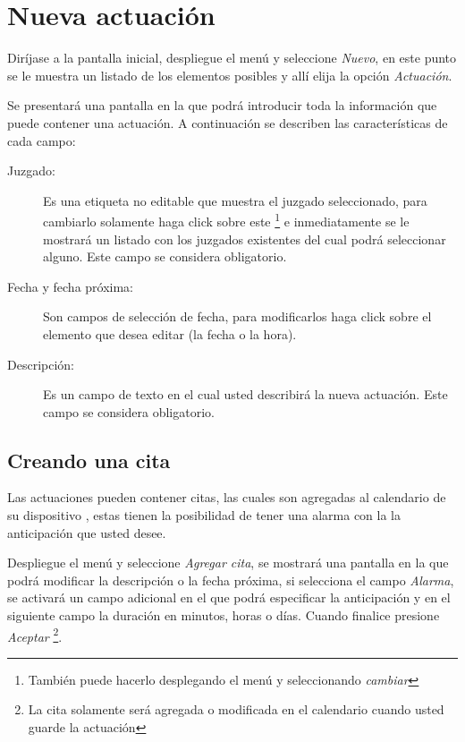 \section{Nueva actuaci\'on}
\label{sec:nuevaActuacion}
Dir\'ijase a la pantalla inicial, despliegue el men\'u \blackberry y seleccione
\emph{Nuevo}, en este punto se le muestra un listado de los elementos posibles y
all\'i elija la opci\'on \emph{Actuaci\'on}.

Se presentar\'a una pantalla en la que podr\'a introducir toda la informaci\'on
que puede contener una actuaci\'on. A continuaci\'on se describen las
caracter\'isticas de cada campo:

\begin{description}
\item[Juzgado:]Es una etiqueta no editable que muestra el juzgado
seleccionado, para cambiarlo solamente haga click sobre este
\footnote{Tambi\'en puede hacerlo desplegando el men\'u \blackberry y
seleccionando \emph{cambiar}}
e inmediatamente se le mostrar\'a un listado con los juzgados existentes del
cual podr\'a seleccionar alguno. Este campo se considera obligatorio.
\item[Fecha y fecha pr\'oxima:]Son campos de selecci\'on de fecha, para
modificarlos haga click sobre el elemento que desea editar (la fecha o la hora).
\item[Descripci\'on:]Es un campo de texto en el cual usted describir\'a la
nueva actuaci\'on. Este campo se considera obligatorio.
\end{description}

\subsection{Creando una cita}
\label{sec:crearCita}
Las actuaciones pueden contener citas, las cuales son agregadas al calendario
de su dispositivo \blackberry, estas tienen la posibilidad de tener una alarma
con la la anticipaci\'on que usted desee.

Despliegue el men\'u \blackberry y seleccione \emph{Agregar cita}, se mostrar\'a una
pantalla en la que podr\'a modificar la descripci\'on o la fecha pr\'oxima,
si selecciona el campo \emph{Alarma}, se activar\'a un campo adicional en el
que podr\'a especificar la anticipaci\'on y en el siguiente campo la duraci\'on
en minutos, horas o d\'ias. Cuando finalice presione \emph{Aceptar}
\footnote{La cita solamente ser\'a agregada o modificada en el calendario cuando
usted guarde la actuaci\'on}.

